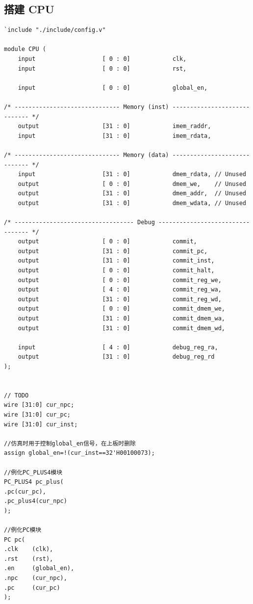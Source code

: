 \documentclass[12pt,a4paper]{ctexart}
\begin{document}
\subsection{搭建 CPU}
\begin{lstlisting}[style=verilog]
`include "./include/config.v"

module CPU (
    input                   [ 0 : 0]            clk,
    input                   [ 0 : 0]            rst,

    input                   [ 0 : 0]            global_en,

/* ------------------------------ Memory (inst) ----------------------------- */
    output                  [31 : 0]            imem_raddr,
    input                   [31 : 0]            imem_rdata,

/* ------------------------------ Memory (data) ----------------------------- */
    input                   [31 : 0]            dmem_rdata, // Unused
    output                  [ 0 : 0]            dmem_we,    // Unused
    output                  [31 : 0]            dmem_addr,  // Unused
    output                  [31 : 0]            dmem_wdata, // Unused

/* ---------------------------------- Debug --------------------------------- */
    output                  [ 0 : 0]            commit,
    output                  [31 : 0]            commit_pc,
    output                  [31 : 0]            commit_inst,
    output                  [ 0 : 0]            commit_halt,
    output                  [ 0 : 0]            commit_reg_we,
    output                  [ 4 : 0]            commit_reg_wa,
    output                  [31 : 0]            commit_reg_wd,
    output                  [ 0 : 0]            commit_dmem_we,
    output                  [31 : 0]            commit_dmem_wa,
    output                  [31 : 0]            commit_dmem_wd,

    input                   [ 4 : 0]            debug_reg_ra,
    output                  [31 : 0]            debug_reg_rd
);


// TODO
wire [31:0] cur_npc;
wire [31:0] cur_pc;
wire [31:0] cur_inst;

//仿真时用于控制global_en信号，在上板时删除
assign global_en=!(cur_inst==32'H00100073);

//例化PC_PLUS4模块
PC_PLUS4 pc_plus(
.pc(cur_pc),
.pc_plus4(cur_npc)
);

//例化PC模块
PC pc(
.clk    (clk),
.rst    (rst),
.en     (global_en),   
.npc    (cur_npc),
.pc     (cur_pc)
);


\end{lstlisting}
\end{document}
